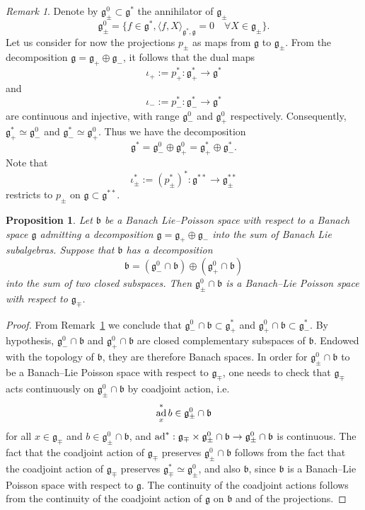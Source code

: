 \documentclass[a4paper,12pt,reqno]{amsart}%
\newtheorem{proposition}[theorem]{Proposition}
\theoremstyle{definition}
\theoremstyle{remark}
\newtheorem{remark}[theorem]{Remark}
\numberwithin{theorem}{section}
\numberwithin{equation}{section}
\newcommand{\1}{{\bf 1}}
\DeclareMathOperator{\ad}{\textnormal{ad}}
\newcommand{\g}{{\mathfrak g}}
\newcommand{\bg}{{\mathfrak b}}
\begin{document}
\begin{remark}\label{rem:annih}
Denote by
$\g_\pm^0\subset \g^*$ the annihilator of $\g_\pm$
  \[
  \g_\pm^0 = \{ f\in\g^*, \langle f, X\rangle_{\g^*, \mathfrak{g}} = 0\quad \forall X\in \g_\pm\}.
  \]
Let us consider for now the projections $p_\pm$ as maps from $\g$ to $\g_\pm$.
From the decomposition $\g = \g_+\oplus \g_-$, it follows that the dual maps
     \[
\iota_+ := p_+^*: \g_+^*\rightarrow \g^*
     \]
and 
     \[
\iota_- := p_-^*: \g_-^*\rightarrow \g^*
     \]
are continuous and injective, with range $\g_-^0$ and $\g_+^0$ respectively. Consequently, $\g_+^*\simeq \g_-^0$ and $\g_-^*\simeq \g_+^0$. Thus we have the decomposition
  \[ \g^* = \g_-^0 \oplus \g_+^0 = \g_+^* \oplus \g_-^*. \]
  Note that 
  \[
\iota_\pm^* := (p_\pm^*)^*: \g^{**}\rightarrow \g_\pm^{**}
     \]
     restricts to $p_\pm$ on $\g\subset \g^{**}$.
\end{remark}

\begin{proposition}\label{prop_more_results}
  Let $\bg$ be a Banach Lie--Poisson space with respect to a Banach space $\g$ admitting a decomposition $\g = \g_+\oplus \g_-$ into the sum of Banach Lie subalgebras.  
  Suppose that $\bg$ has a decomposition
  \begin{equation}\label{decbg}
\bg = \left(\g_-^0\cap\bg\right) \oplus \left(\g_+^0\cap\bg\right)
\end{equation}
  into the sum of two closed subspaces. Then $\g_\pm^0\cap\bg$  is a Banach--Lie Poisson space with respect to $\g_\mp$.
\end{proposition}

\begin{proof}
     From Remark~\ref{rem:annih} we conclude that $\g_-^0\cap\bg \subset \g_+^*$ and $\g_+^0\cap\bg \subset \g_-^*$. By hypothesis, $\g_-^0\cap\bg$ and $\g_+^0\cap\bg$ are closed complementary subspaces of $\bg$. Endowed with the topology of $\bg$, they are therefore Banach spaces. In order for $\g_\pm^0\cap\bg$ to be a Banach--Lie Poisson space with respect to $\g_\mp$, one needs to check that $\g_\mp$ acts continuously on $\g_\pm^0\cap\bg$ by coadjoint action, i.e.
\[
\ad^*_x b \in\g_\pm^0\cap\bg
\]
for all $x \in \g_\mp$ and $b\in\g_\pm^0\cap\bg$, and $\ad^*:\g_\mp\times\g_\pm^0\cap\bg\rightarrow \g_\pm^0\cap\bg$ is continuous. The fact that the coadjoint action of $\g_\mp$ preserves $\g_\pm^0\cap\bg$ follows from the fact that the coadjoint action of $\g_\mp$ preserves $\g_\mp^*\simeq \g_\pm^0$, and also $\bg$, since $\bg$ is a Banach--Lie Poisson space with respect to $\g$. The continuity of the coadjoint actions follows from the continuity of the coadjoint action of $\g$ on $\bg$ and of the projections.
\end{proof}
\end{document}
